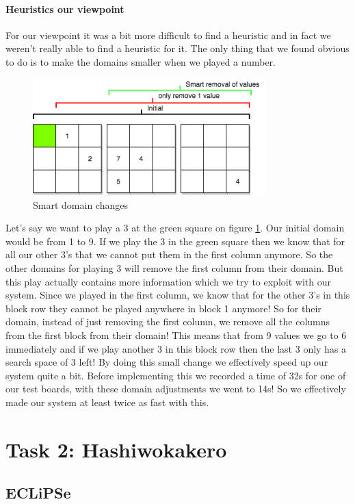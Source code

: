 \documentclass{report}
\newcommand{\mychapter}[2]{
    \setcounter{chapter}{#1}
    \setcounter{section}{0}
    \chapter*{#2}
    \addcontentsline{toc}{chapter}{#2}
}
\begin{document}
\newpage
\subsubsection{Heuristics our viewpoint}
For our viewpoint it was a bit more difficult to find a heuristic and in fact we weren't really able to find a heuristic for it. The only thing that we found obvious to do is to make the domains smaller when we played a number.
\begin{figure}[h!]
\centering
\includegraphics[width=0.8\textwidth]{smartremoval}
\caption{Smart domain changes}
\label{fig:smart_domain}
\end{figure}
Let's say we want to play a 3 at the green square on figure \ref{fig:smart_domain}. Our initial domain would be from 1 to 9. If we play the 3 in the green square then we know that for all our other 3's that we cannot put them in the first column anymore. So the other domains for playing 3 will remove the first column from their domain. But this play actually contains more information which we try to exploit with our system. Since we played in the first column, we know that for the other 3's in this block row they cannot be played anywhere in block 1 anymore! So for their domain, instead of just removing the first column, we remove all the columns from the first block from their domain! This means that from 9 values we go to 6 immediately and if we play another 3 in this block row then the last 3 only has a search space of 3 left! By doing this small change we effectively speed up our system quite a bit. Before implementing this we recorded a time of 32s for one of our test boards, with these domain adjustments we went to 14s! So we effectively made our system at least twice as fast with this.

\mychapter{2}{Task 2: Hashiwokakero}
\label{sec:Hashiwokakero}

\section{ECLiPSe}
\end{document}
